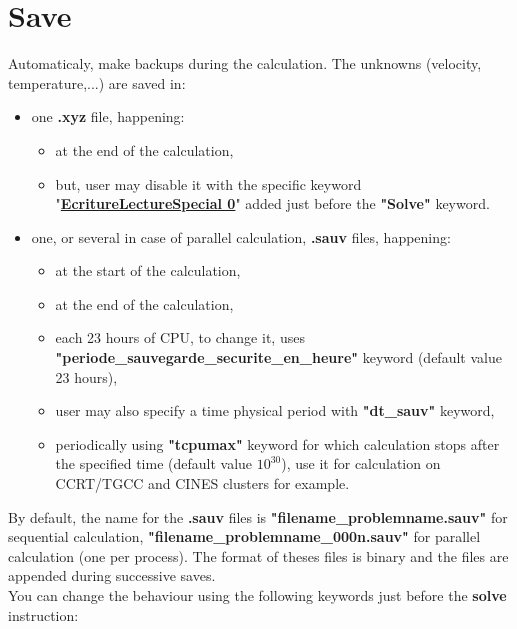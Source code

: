 \section{Save}
Automaticaly, \trust make backups during the calculation. The unknowns (velocity, temperature,...) are saved in:
\begin{itemize}
\item one \textbf{.xyz} file, happening:
    \begin{itemize}
    \item at the end of the calculation,
    \item but, user may disable it with the specific keyword "\href{../../Outils/TRIOXDATA/XTriou/doc.pdf\#ecriturelecturespecial}{\textbf{EcritureLectureSpecial 0}}" added just before the \textbf{"Solve"} keyword.
    \end{itemize}


\item one, or several in case of parallel calculation, \textbf{.sauv} files, happening:
    \begin{itemize}
    \item at the start of the calculation,
    \item at the end of the calculation,
    \item each 23 hours of CPU, to change it, uses \small \textbf{"periode\_sauvegarde\_securite\_en\_heure"} \normalsize keyword (default value 23 hours),
    \item user may also specify a time physical period with \textbf{"dt\_sauv"} keyword,
    \item periodically using \textbf{"tcpumax"} keyword for which calculation stops after the specified time (default value $10^{30}$), use it for calculation on CCRT/TGCC and CINES clusters for example.
    \end{itemize}
\end{itemize}


By default, the name for the \textbf{.sauv} files is \textbf{"filename\_problemname.sauv"} for sequential calculation, \textbf{"filename\_problemname\_000n.sauv"} for parallel calculation (one per process).
The format of theses files is binary and the files are appended during successive saves.\\

You can change the behaviour using the following keywords just before the \textbf{solve} instruction:
\begin{center}
\end{center}

